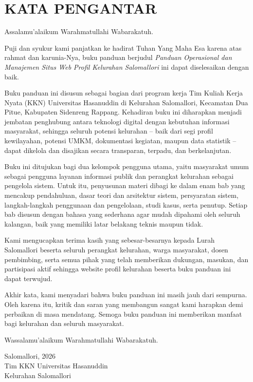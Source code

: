 \documentclass[12pt,a4paper]{report}
\newcommand{\unnumberedchapter}[1]{%
  \chapter*{#1}%
  \addcontentsline{toc}{chapter}{#1}%
}
\begin{document}

\unnumberedchapter{KATA PENGANTAR}

Assalamu'alaikum Warahmatullahi Wabarakatuh.

Puji dan syukur kami panjatkan ke hadirat Tuhan Yang Maha Esa karena atas rahmat dan karunia-Nya, buku panduan berjudul \emph{Panduan Operasional dan Manajemen Situs Web Profil Kelurahan Salomallori} ini dapat diselesaikan dengan baik.

Buku panduan ini disusun sebagai bagian dari program kerja Tim Kuliah Kerja Nyata (KKN) Universitas Hasanuddin di Kelurahan Salomallori, Kecamatan Dua Pitue, Kabupaten Sidenreng Rappang. Kehadiran buku ini diharapkan menjadi jembatan penghubung antara teknologi digital dengan kebutuhan informasi masyarakat, sehingga seluruh potensi kelurahan -- baik dari segi profil kewilayahan, potensi UMKM, dokumentasi kegiatan, maupun data statistik -- dapat dikelola dan disajikan secara transparan, terpadu, dan berkelanjutan.

Buku ini ditujukan bagi dua kelompok pengguna utama, yaitu masyarakat umum sebagai pengguna layanan informasi publik dan perangkat kelurahan sebagai pengelola sistem. Untuk itu, penyusunan materi dibagi ke dalam enam bab yang mencakup pendahuluan, dasar teori dan arsitektur sistem, persyaratan sistem, langkah-langkah penggunaan dan pengelolaan, studi kasus, serta penutup. Setiap bab disusun dengan bahasa yang sederhana agar mudah dipahami oleh seluruh kalangan, baik yang memiliki latar belakang teknis maupun tidak.

Kami mengucapkan terima kasih yang sebesar-besarnya kepada Lurah Salomallori beserta seluruh perangkat kelurahan, warga masyarakat, dosen pembimbing, serta semua pihak yang telah memberikan dukungan, masukan, dan partisipasi aktif sehingga website profil kelurahan beserta buku panduan ini dapat terwujud.

Akhir kata, kami menyadari bahwa buku panduan ini masih jauh dari sempurna. Oleh karena itu, kritik dan saran yang membangun sangat kami harapkan demi perbaikan di masa mendatang. Semoga buku panduan ini memberikan manfaat bagi kelurahan dan seluruh masyarakat.

Wassalamu'alaikum Warahmatullahi Wabarakatuh.

\vspace{1.5cm}
\begin{flushright}
Salomallori, 2026\\
Tim KKN Universitas Hasanuddin\\
Kelurahan Salomallori
\end{flushright}
\end{document}
